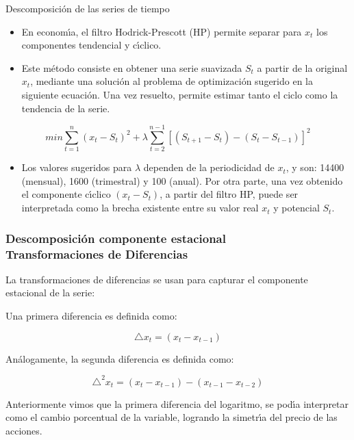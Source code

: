 \documentclass[xcolor=(list of options)]{beamer}
\begin{document}
\begin{section}{Descomposici\'on de las series de tiempo}
\begin{frame}
\begin{itemize}
\item En econom\'\i{}a, el filtro Hodrick-Prescott (HP) permite separar para $x_t$  los componentes tendencial y c\'\i{}clico.
\item Este m\'etodo consiste en obtener una serie suavizada $S_t$ a partir de la original $x_t$, mediante una soluci\'on al problema de optimizaci\'on sugerido en la siguiente ecuaci\'on. Una vez resuelto, permite estimar tanto el ciclo como la tendencia de la serie.
\end{itemize}

\begin{equation*}
min \sum_{t=1}^{n} \left(x_t -S_t\right)^2 + \lambda \sum_{t=2}^{n-1} \left[ \left(S_{t+1}-S_t\right)-\left(S_t-S_{t-1}\right)\right]^2
\end{equation*}

\begin{itemize}
\item Los valores sugeridos para $\lambda$ dependen de la periodicidad de $x_t$, y son: 14400 (mensual), 1600 (trimestral) y 100 (anual). Por otra parte, una vez obtenido el componente c\'\i{}clico $ \left(x_t -S_t\right)$, a partir del filtro HP, puede ser interpretada como la brecha existente entre su valor real $x_t$ y potencial $S_t$.
\end{itemize}

\end{frame}

\begin{frame}
\frametitle{Descomposici\'on componente estacional\\
Transformaciones de Diferencias}

La transformaciones de diferencias se usan para capturar el componente estacional de la serie:

Una primera diferencia es definida como:

\begin{equation*}
\triangle x_t = (x_t - x_{t-1})
\end{equation*}

An\'alogamente, la segunda diferencia es definida como:

\begin{equation*}
\triangle^2x_t = (x_t - x_{t-1})-(x_{t-1} - x_{t-2})
\end{equation*}

Anteriormente vimos que la primera diferencia del logaritmo, se pod\'\i{}a interpretar como el cambio porcentual de la variable, logrando la simetr\'\i{}a del precio de las acciones.


\end{frame}
\end{section}
\end{document}

